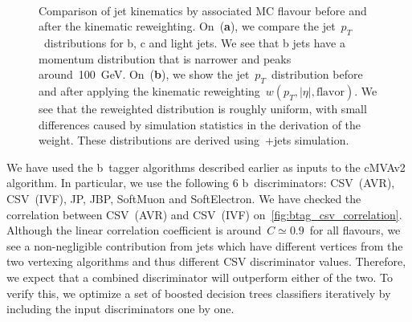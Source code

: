 \begin{figure}
\begin{centering}
 \\
\caption{Comparison of jet kinematics by associated MC flavour before and after the kinematic reweighting. On~(\textbf{a}), we compare the jet~$p_T$~distributions for b, c and light jets. We see that b jets have a momentum distribution that is narrower and peaks around~100~GeV. On~(\textbf{b}), we show the jet~$p_T$~distribution before and after applying the kinematic reweighting~$w(p_T,|\eta|,\mathrm{flavor})$. We see that the reweighted distribution is roughly uniform, with small differences caused by simulation statistics in the derivation of the weight. These distributions are derived using~\ttbar+jets simulation.}
\label{fig:btag_pt_reweight}
\end{centering}
\end{figure}

We have used the b~tagger algorithms described earlier as inputs to the cMVAv2 algorithm. In particular, we use the following 6 b~discriminators: CSV~(AVR), CSV~(IVF), JP, JBP, SoftMuon and SoftElectron. We have checked the correlation between CSV~(AVR) and CSV~(IVF) on~\cref{fig:btag_csv_correlation}. Although the linear correlation coefficient is around~$C \simeq 0.9$~for all flavours, we see a non-negligible contribution from jets which have different vertices from the two vertexing algorithms and thus different CSV discriminator values. Therefore, we expect that a combined discriminator will outperform either of the two. To verify this, we optimize a set of boosted decision trees classifiers iteratively by including the input discriminators one by one.

